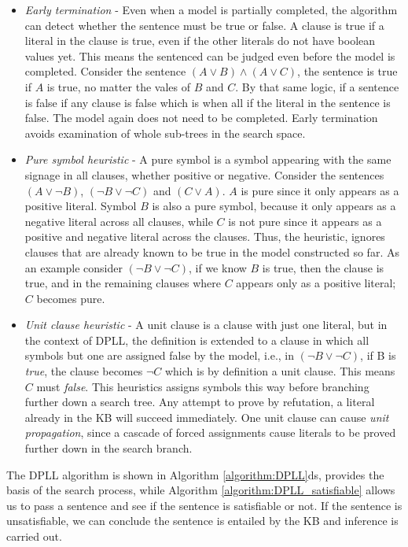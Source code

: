 \begin{itemize}
	\item \textit{Early termination} - Even when a model is partially completed, the algorithm can detect whether the sentence must be true or false. A clause is true if a literal in the clause is true, even if the other literals do not have boolean values yet. This means the sentenced can be judged even before the model is completed. Consider the sentence $(A \vee B) \wedge (A \vee C)$, the sentence is true if $A$ is true, no matter the vales of $B$ and $C$. By that same logic, if a sentence is false if any clause is false which is when all if the literal in the sentence is false. The model again does not need to be completed. Early termination avoids examination of whole sub-trees in the search space.

	
	\item \textit{Pure symbol heuristic} - A pure symbol is a symbol appearing with the same signage in all clauses, whether positive or negative. Consider the sentences $(A \vee \neg B)$, $(\neg B \vee \neg C)$ and $(C \vee A)$. $A$ is pure since it only appears as a positive literal. Symbol $B$ is also a pure symbol, because it only appears as a negative literal across all clauses, while $C$ is not pure since it appears as a positive and negative literal across the clauses. Thus, the heuristic, ignores clauses that are already known to be true in the model constructed so far. As an example consider $(\neg B \vee \neg C)$, if we know $B$ is true, then the clause is true, and in the remaining clauses where $C$ appears only as a positive literal; $C$ becomes pure.
	
	\item \textit{Unit clause heuristic} - A unit clause is a clause with just one literal, but in the context of DPLL, the definition is extended  to a clause in which all symbols but one are assigned false by the model, i.e., in  $(\neg B \vee \neg C)$, if B is \textit{true}, the clause becomes $\neg C$ which is by definition a unit clause. This means $C$ must \textit{false}. This heuristics assigns symbols this way before branching further down a search tree. Any attempt to prove by refutation, a literal already in the KB will succeed immediately. One unit clause can cause \textit{unit propagation}, since a cascade of forced assignments cause literals to be proved further down in the search branch.


\end{itemize}

The DPLL algorithm is shown in Algorithm \ref{algorithm:DPLL}ds, provides the basis of the search process, while Algorithm \ref{algorithm:DPLL_satisfiable} allows us to pass a sentence and see if the sentence is satisfiable or not. If the sentence is unsatisfiable, we can conclude the sentence is entailed by the KB and inference is carried out. 

